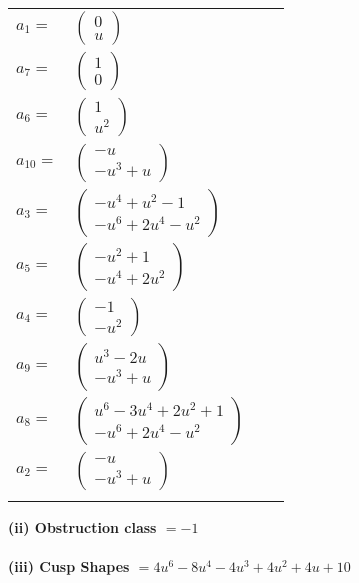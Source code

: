 \documentclass[1p]{elsarticle_modified}
\theoremstyle{definition}
\begin{document}
\begin{tabular}{m{7pt} m{180pt} m{7pt} m{180pt} }
\flushright $a_{1}=$&$\begin{pmatrix}0\\u\end{pmatrix}$ \\
\flushright $a_{7}=$&$\begin{pmatrix}1\\0\end{pmatrix}$ \\
\flushright $a_{6}=$&$\begin{pmatrix}1\\u^2\end{pmatrix}$ \\
\flushright $a_{10}=$&$\begin{pmatrix}- u\\- u^3+u\end{pmatrix}$ \\
\flushright $a_{3}=$&$\begin{pmatrix}- u^4+u^2-1\\- u^6+2 u^4- u^2\end{pmatrix}$ \\
\flushright $a_{5}=$&$\begin{pmatrix}- u^2+1\\- u^4+2 u^2\end{pmatrix}$ \\
\flushright $a_{4}=$&$\begin{pmatrix}-1\\- u^2\end{pmatrix}$ \\
\flushright $a_{9}=$&$\begin{pmatrix}u^3-2 u\\- u^3+u\end{pmatrix}$ \\
\flushright $a_{8}=$&$\begin{pmatrix}u^6-3 u^4+2 u^2+1\\- u^6+2 u^4- u^2\end{pmatrix}$ \\
\flushright $a_{2}=$&$\begin{pmatrix}- u\\- u^3+u\end{pmatrix}$\\&\end{tabular}
\flushleft \textbf{(ii) Obstruction class $= -1$}\\~\\
\flushleft \textbf{(iii) Cusp Shapes $= 4 u^6-8 u^4-4 u^3+4 u^2+4 u+10$}\\~\\
\end{document}
